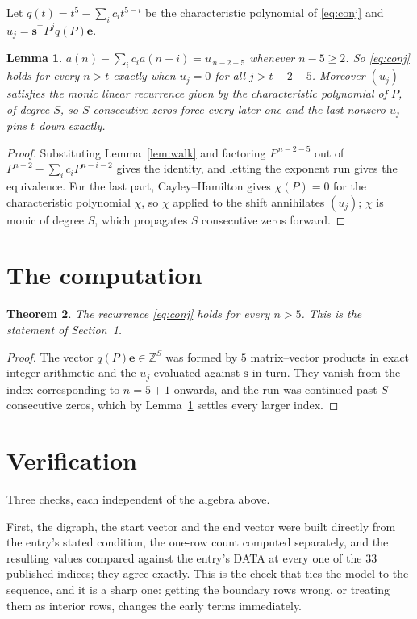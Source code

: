 \documentclass[11pt,a4paper]{article}
\theoremstyle{plain}
\newtheorem{theorem}{Theorem}
\newtheorem{lemma}[theorem]{Lemma}
\theoremstyle{definition}
\begin{document}
Let $q(t)=t^{5}-\sum_i c_i t^{5-i}$ be the characteristic polynomial of
\eqref{eq:conj} and $u_j=\mathbf{s}^{\!\top}P^{j}q(P)\mathbf{e}$.

\begin{lemma}\label{lem:crit}
$a(n)-\sum_i c_i a(n-i)=u_{\,n-2-5}$ whenever $n-5\ge2$. So \eqref{eq:conj}
holds for every $n>t$ exactly when $u_j=0$ for all $j>t-2-5$. Moreover $(u_j)$
satisfies the monic linear recurrence given by the characteristic polynomial of $P$, of
degree $S$, so $S$ consecutive zeros force every later one and the last nonzero $u_j$ pins
$t$ down exactly.
\end{lemma}

\begin{proof}
Substituting Lemma~\ref{lem:walk} and factoring $P^{\,n-2-5}$ out of
$P^{n-2}-\sum_i c_i P^{n-i-2}$ gives the identity, and letting the exponent run gives the
equivalence. For the last part, Cayley--Hamilton gives $\chi(P)=0$ for the characteristic
polynomial $\chi$, so $\chi$ applied to the shift annihilates $(u_j)$; $\chi$ is monic of
degree $S$, which propagates $S$ consecutive zeros forward.
\end{proof}

\section{The computation}

\begin{theorem}
The recurrence \eqref{eq:conj} holds for every $n>5$. This is the statement of
Section~1.
\end{theorem}

\begin{proof}
The vector $q(P)\mathbf{e}\in\mathbb{Z}^{S}$ was formed by $5$ matrix--vector
products in exact integer arithmetic and the $u_j$ evaluated against $\mathbf{s}$ in turn.
They vanish from the index corresponding to $n=5+1$ onwards, and the run was continued
past $S$ consecutive zeros, which by Lemma~\ref{lem:crit} settles every larger index.
\end{proof}

\section{Verification}

Three checks, each independent of the algebra above.

First, the digraph, the start vector and the end vector were built directly from the
entry's stated condition, the one-row count computed separately, and the resulting values
compared against the entry's DATA at every one of the $33$ published indices; they
agree exactly. This is the check that ties the model to the sequence, and it is a sharp one:
getting the boundary rows wrong, or treating them as interior rows, changes the early terms
immediately.
\end{document}
